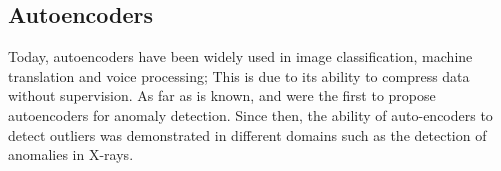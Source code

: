 \subsection{Autoencoders}

Today, autoencoders have been widely used in image classification, machine translation and voice processing; This is due to its ability to compress data without supervision. As far as is known,  and  were the first to propose autoencoders for anomaly detection. Since then, the ability of auto-encoders to detect outliers was demonstrated in different domains such as the detection of anomalies in X-rays.

\vspace{5mm} %

